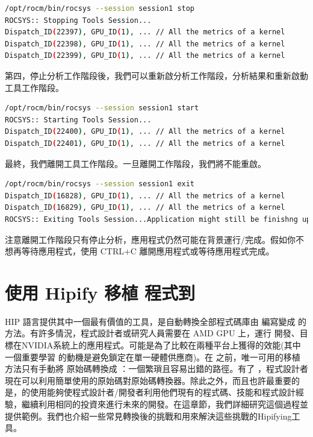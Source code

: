 \begin{lstlisting}[language=bash, caption={停止分析工作階段}, label={lst:Stopping the profiling session}]
/opt/rocm/bin/rocsys --session session1 stop
ROCSYS:: Stopping Tools Session...
Dispatch_ID(22397), GPU_ID(1), ... // All the metrics of a kernel
Dispatch_ID(22398), GPU_ID(1), ... // All the metrics of a kernel
Dispatch_ID(22399), GPU_ID(1), ... // All the metrics of a kernel
\end{lstlisting}

第四，停止分析工作階段後，我們可以重新啟分析工作階段，分析結果和重新啟動工具工作階段。

\begin{lstlisting}[language=bash, caption={重啟分析工作階段}, label={lst:Restarting the profiling session}]
/opt/rocm/bin/rocsys --session session1 start
ROCSYS:: Starting Tools Session...
Dispatch_ID(22400), GPU_ID(1), ... // All the metrics of a kernel
Dispatch_ID(22401), GPU_ID(1), ... // All the metrics of a kernel
\end{lstlisting}

最終，我們離開工具工作階段。一旦離開工作階段，我們將不能重啟。

\begin{lstlisting}[language=bash, caption={離開分析工作階段}, label={lst:Exiting the profiling session}]
/opt/rocm/bin/rocsys --session session1 exit
Dispatch_ID(16828), GPU_ID(1), ... // All the metrics of a kernel
Dispatch_ID(16829), GPU_ID(1), ... // All the metrics of a kernel
ROCSYS:: Exiting Tools Session...Application might still be finishng up..
\end{lstlisting}

注意離開工作階段只有停止分析，應用程式仍然可能在背景運行/完成。假如你不想再等待應用程式，使用 CTRL+C 離開應用程式或等待應用程式完成。

\section{使用 Hipify 移植  程式到 }

HIP 語言提供其中一個最有價值的工具，是自動轉換全部程式碼庫由 編寫變成  的方法。有許多情況，程式設計者或研究人員需要在 AMD GPU 上，運行  開發、目標在NVIDIA系統上的應用程式。可能是為了比較在兩種平台上獲得的效能(其中一個重要學習  的動機是避免鎖定在單一硬體供應商)。在  之前，唯一可用的移植方法只有手動將  原始碼轉換成 ：一個繁瑣且容易出錯的路徑。有了 ，程式設計者現在可以利用簡單使用的原始碼對原始碼轉換器。除此之外，而且也許最重要的是，的使用能夠使程式設計者/開發者利用他們現有的程式碼、技能和程式設計經驗，繼續利用相同的投資來進行未來的開發。在這章節，我們詳細研究這個過程並提供範例。我們也介紹一些常見轉換後的挑戰和用來解決這些挑戰的Hipifying工具。

